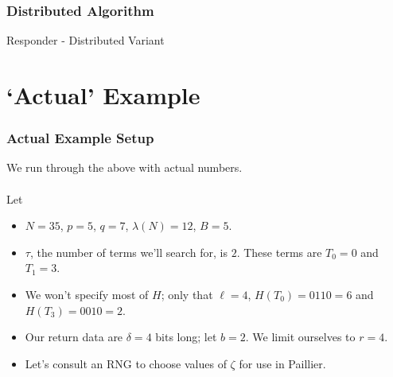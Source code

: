 \documentclass{beamer}
\makeatletter
\DeclareRobustCommand*{\&}{%
  \nfss@text{%
    \fontfamily{LinuxBiolinumT-TLF}%
    \selectfont
    \symbol{`\&}%
  }%
}
\makeatother
\begin{document}
\begin{frame}
  \frametitle{Distributed Algorithm}
  \begin{algorithm}[H]
  \caption{Responder -  Distributed Variant}\label{alg.dist_processing}
\begin{algorithmic}[1]
  \EndFor{\scriptsize }
\EndFor{\scriptsize }
\EndFor{\scriptsize }
\EndWhile{\scriptsize }
\EndFor{\scriptsize }
\EndFor{\scriptsize }
\end{algorithmic}
\end{algorithm}
\end{frame}

\section{`Actual' Example}
\begin{frame}
  \frametitle{Actual Example Setup}
We run through the above with actual numbers.\\~\\
Let
\begin{itemize}
  \item $N = 35$, $p=5$, $q=7$, $\lambda(N) = 12$, $B=5$.
  \item $\tau$, the number of terms we'll search for, is $2$. These terms are
    $T_0 = 0$ and $T_1 = 3$.
  \item We won't specify most of $H$; only that $\ell=4$, $H(T_0) = 0110 = 6$ and
    $H(T_3) = 0010 = 2$.
  \item Our return data are $\delta=4$ bits long; let $b=2$. We limit ourselves
    to $r=4$.
  \item Let's consult an RNG to choose values of $\zeta$ for use in Paillier.
\end{itemize}
\end{frame}
\end{document}
